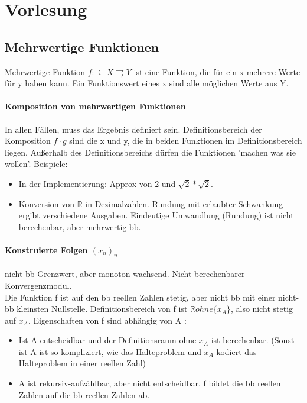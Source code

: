 \documentclass[ngerman]{scrartcl}
\begin{document}
\section{Vorlesung}
\subsection{Mehrwertige Funktionen}
Mehrwertige Funktion $ f: \subseteq X \rightrightarrows  Y $ ist eine Funktion, die für ein x mehrere Werte für y haben kann. Ein Funktionswert eines x sind alle möglichen Werte aus Y.

\paragraph{Komposition von mehrwertigen Funktionen} In allen Fällen, muss das Ergebnis definiert sein. Definitionsbereich  der Komposition $ f \cdot g $ sind die x und y, die in beiden Funktionen im Definitionsbereich liegen. Außerhalb des Definitionsbereichs dürfen die Funktionen 'machen was sie wollen'. Beispiele:
\begin{itemize}
  \item In der Implementierung: Approx von 2 und $ \sqrt{2} * \sqrt{2} $.
  \item Konversion von $ \mathbb{R} $ in Dezimalzahlen. Rundung mit erlaubter Schwankung ergibt verschiedene Ausgaben. Eindeutige Umwandlung (Rundung) ist nicht berechenbar, aber mehrwertig bb.
\end{itemize}

\paragraph{Konstruierte Folgen $ (x_n)_n $} nicht-bb Grenzwert, aber monoton wachsend. Nicht berechenbarer Konvergenzmodul. \\
Die Funktion f ist auf den bb reellen Zahlen stetig, aber nicht bb mit einer nicht-bb kleinsten Nullstelle. Definitionsbereich von f ist $ \mathbb{R} ohne \{x_A \} $, also nicht stetig auf $ x_A $. Eigenschaften von f sind abhängig von A :
\begin{itemize}
  \item Ist A entscheidbar und der Definitionsraum ohne $ x_A $ ist berechenbar. (Sonst ist A ist so kompliziert, wie das Halteproblem und $ x_A $ kodiert das Halteproblem in einer reellen Zahl)
  \item A ist rekursiv-aufzählbar, aber nicht entscheidbar. f bildet die bb reellen Zahlen auf die bb reellen Zahlen ab. 
\end{itemize}
 
\end{document}
